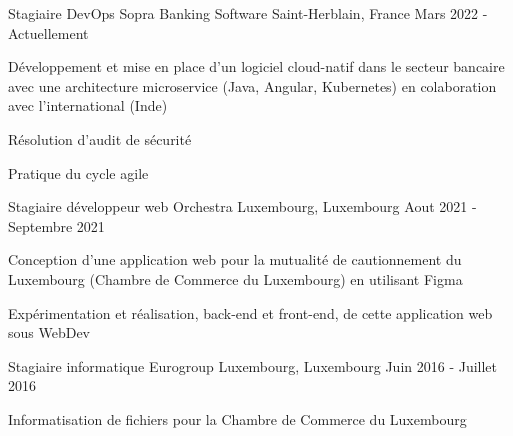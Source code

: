 
\begin{cventries}
  \cventry
    {Stagiaire DevOps} %
    {Sopra Banking Software} %
    {Saint-Herblain, France} %
    {Mars 2022 - Actuellement} %
    {
      \begin{cvitems} %
        \item {Développement et mise en place d'un logiciel cloud-natif dans le secteur bancaire avec une architecture microservice   (Java, Angular, Kubernetes) en colaboration avec l'international (Inde)}
        \item {Résolution d'audit de sécurité}
        \item {Pratique du cycle agile}
      \end{cvitems}
    }
    
  \cventry
    {Stagiaire développeur web} %
    {Orchestra} %
    {Luxembourg, Luxembourg} %
    {Aout 2021 - Septembre 2021} %
    {
      \begin{cvitems} %
        \item {Conception d'une application web pour la mutualité de cautionnement du Luxembourg (Chambre de Commerce du Luxembourg) en utilisant Figma}
        \item {Expérimentation et réalisation, back-end et front-end, de cette application web sous WebDev}
      \end{cvitems}
    }

  \cventry
    {Stagiaire informatique} %
    {Eurogroup} %
    {Luxembourg, Luxembourg} %
    {Juin 2016 - Juillet 2016} %
    {
      \begin{cvitems} %
        \item {Informatisation de fichiers pour la Chambre de Commerce du Luxembourg}
      \end{cvitems}
    }

\end{cventries}
